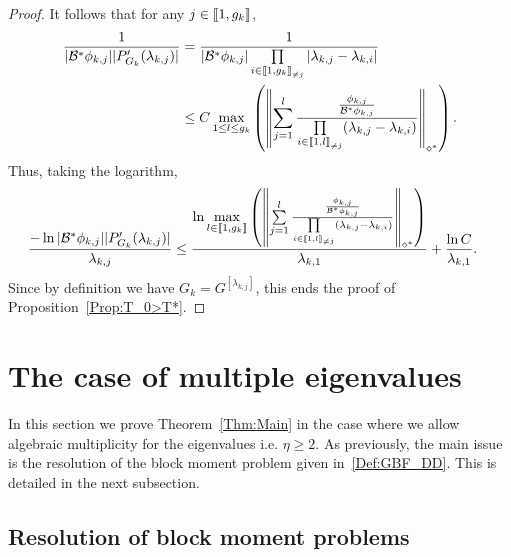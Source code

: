 \documentclass[11pt]{article}
\theoremstyle{definition}
\numberwithin{equation}{section}
\numberwithin{figure}{section}
\numberwithin{table}{section}
\newcommand{\llbracket}{\mathopen{[\mkern -2.7mu[}}
\newcommand{\rrbracket}{\mathclose{]\mkern -2.7mu]}}
\newcommand{\inter}[2]{\llbracket #1,#2 \rrbracket}
\newcommand{\interexclu}[3]{\llbracket #1,#2\rrbracket_{\neq #3}}
\newcommand\Bs{\mathcal{B}^*}
\newcommand{\normeXalphas}[1]{\left\| #1 \right\|_{\diamond^*}}
\newcommand{\n}{g}
\begin{document}
\begin{proof}
It follows that for any $j \in \inter{1}{\n_k}$,
\begin{align*}
\frac{1}{ | \Bs\phi_{k,j} | | P_{G_k}'(\lambda_{k,j}) | } &= \frac{1}{ | \Bs \phi_{k,j} | \prod\limits_{i\in \interexclu{1}{\n_k}{j}}|\lambda_{k,j}-\lambda_{k,i} | }
\\
&\leq C \max\limits_{1 \leq l \leq \n_k} \left(\normeXalphas{ \sum\limits_{j=1}^{l} \frac{ \frac{\phi_{k,j}}{\Bs \phi_{k,j}}}{\prod\limits_{i\in \interexclu{1}{l}{j} } (\lambda_{k,j}-\lambda_{k,i})} } \right).
\end{align*}
Thus, taking the logarithm,
\begin{align*}
\frac{-\ln | \Bs \phi_{k,j} | | P_{G_k}'(\lambda_{k,j}) |}{\lambda_{k,j}} &\leq \frac{\ln \max\limits_{l\in \inter{1}{\n_k} } \left(\normeXalphas{ \sum\limits_{j=1}^{l} \frac{ \frac{\phi_{k,j}}{\Bs \phi_{k,j}}}{\prod\limits_{i\in \interexclu{1}{l}{j}} (\lambda_{k,j}-\lambda_{k,i})} } \right)}{\lambda_{k,1}} + \frac{\ln C}{\lambda_{k,1}}.
\end{align*}
Since by definition we have $G_k=G^{[\lambda_{k,j}]}$, this ends the proof of Proposition~\ref{Prop:T_0>T*}.
\end{proof}



\section{The case of multiple eigenvalues}\label{Sec:ValPropresMultiples}

In this section we prove Theorem~\ref{Thm:Main} in the case where we allow algebraic multiplicity for the eigenvalues i.e. $\eta \geq 2$. As previously, the main issue is the resolution of the block moment problem given in~\eqref{Def:GBF_DD}. This is detailed in the next subsection.



\subsection{Resolution of block moment problems}
\end{document}
